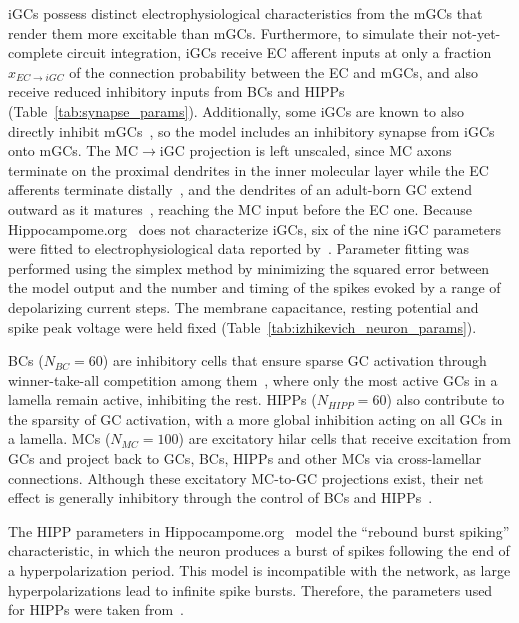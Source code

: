 iGCs possess distinct electrophysiological characteristics from the mGCs that render them more excitable than mGCs. Furthermore,
to simulate their not-yet-complete circuit integration, iGCs receive EC afferent inputs at only a fraction $x_{EC \to iGC}$ of the
connection probability between the EC and mGCs, and also receive reduced inhibitory inputs from BCs and HIPPs
(Table~\ref{tab:synapse_params}). Additionally, some iGCs are known to also directly inhibit mGCs~\parencite{lunaAdultborn2019}, so
the model includes an inhibitory synapse from iGCs onto mGCs. The MC$\to$iGC projection is left unscaled, since MC axons terminate
on the proximal dendrites in the inner molecular layer while the EC afferents terminate
distally~\parencite{amaralDentate2007}, and the dendrites of an adult-born GC extend outward as it
matures~\parencite{zhaoDistinct2006}, reaching the MC input before the EC one. Because
Hippocampome.org~\parencite{wheelerHippocampomeorg2023} does not characterize iGCs, six of the nine iGC parameters were fitted to
electrophysiological data reported by~\textcite{espositoNeuronal2005}. Parameter fitting was performed using the
\textcite{nelderSimplex1965} simplex method by minimizing the squared error between the model output and the number and timing of
the spikes evoked by a range of depolarizing current steps. The membrane capacitance, resting potential and spike peak voltage were
held fixed (Table~\ref{tab:izhikevich_neuron_params}).

BCs ($N_{BC} = 60$) are inhibitory cells that ensure sparse GC activation through winner-take-all competition among
them~\parencite{coultripCortical1992, chavlisDendrites2017, kimAdult2024}, where only the most active GCs in a lamella remain active,
inhibiting the rest. HIPPs ($N_{HIPP} = 60$) also contribute to the sparsity of GC activation, with a more global inhibition
acting on all GCs in a lamella. MCs ($N_{MC} = 100$) are excitatory hilar cells that receive excitation from GCs and project
back to GCs, BCs, HIPPs and other MCs via cross-lamellar connections. Although these excitatory MC-to-GC projections exist, their
net effect is generally inhibitory through the control of BCs and HIPPs~\parencite{myersRole2009, scharfmanHilar2013}.

The HIPP parameters in Hippocampome.org~\parencite{wheelerHippocampomeorg2023} model the ``rebound burst spiking'' characteristic,
in which the neuron produces a burst of spikes following the end of a hyperpolarization period. This model is incompatible with
the network, as large hyperpolarizations lead to infinite spike bursts. Therefore, the parameters used for HIPPs were taken
from~\textcite{modakIzhikevich2018}.

